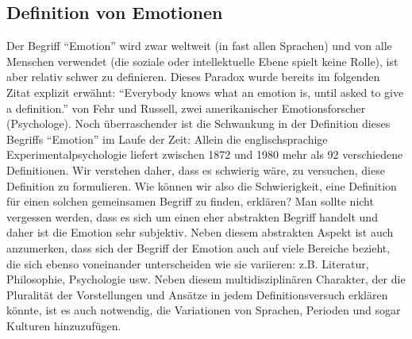 \subsection{Definition von Emotionen} \label{definition-emotionen}




Der Begriff ``Emotion'' wird zwar weltweit  (in fast allen Sprachen) und von alle Menschen verwendet (die soziale oder intellektuelle Ebene spielt keine Rolle), ist aber relativ schwer zu definieren. 
Dieses Paradox wurde bereits im folgenden Zitat explizit erwähnt: 
``Everybody knows what an emotion is, until asked to give a definition.''\cite{fehr_russel_1984} von Fehr und Russell, zwei amerikanischer Emotionsforscher (Psychologe). 
Noch überraschender ist die Schwankung in der Definition dieses Begriffs ``Emotion'' im Laufe der Zeit: Allein die englischsprachige Experimentalpsychologie\cite{plamper12} liefert zwischen 1872 und 1980 mehr als 92 verschiedene Definitionen. 
Wir verstehen daher, dass es schwierig wäre, zu versuchen, diese Definition zu formulieren.  
Wie können wir also die Schwierigkeit, eine Definition für einen solchen gemeinsamen Begriff zu finden, erklären? 
Man sollte nicht vergessen werden, dass es sich um einen eher abstrakten Begriff handelt und daher ist die Emotion sehr subjektiv. 
Neben diesem abstrakten Aspekt ist auch anzumerken, dass sich der Begriff der Emotion auch auf viele Bereiche bezieht, die sich ebenso voneinander unterscheiden wie sie variieren: z.B. Literatur, Philosophie, Psychologie usw. 
Neben diesem multidisziplinären Charakter, der die Pluralität der Vorstellungen und Ansätze in jedem Definitionsversuch erklären könnte, ist es auch notwendig, die Variationen von Sprachen, Perioden und sogar Kulturen hinzuzufügen. \\


